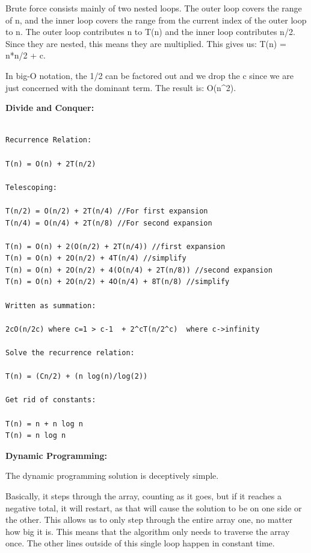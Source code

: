 \documentclass[letterpaper,10pt,titlepage,fleqn]{article}
\begin{document}

Brute force consists mainly of two nested loops. The outer loop covers the range of n, and the inner loop covers the range from the current index of the outer loop to n. The outer loop contributes n to T(n) and the inner loop contributes n/2. Since they are nested, this means they are multiplied. This gives us: T(n) = n*n/2 + c.

In big-O notation, the 1/2 can be factored out and we drop the c since we are just concerned with the dominant term. The result is: O(n^2).

\begin{centering}
\textbf{Divide and Conquer:}
\end{centering}


\begin{lstlisting}

Recurrence Relation:

T(n) = O(n) + 2T(n/2)

Telescoping:

T(n/2) = O(n/2) + 2T(n/4) //For first expansion
T(n/4) = O(n/4) + 2T(n/8) //For second expansion

T(n) = O(n) + 2(O(n/2) + 2T(n/4)) //first expansion
T(n) = O(n) + 2O(n/2) + 4T(n/4) //simplify
T(n) = O(n) + 2O(n/2) + 4(O(n/4) + 2T(n/8)) //second expansion
T(n) = O(n) + 2O(n/2) + 4O(n/4) + 8T(n/8) //simplify

Written as summation:

2cO(n/2c) where c=1 > c-1  + 2^cT(n/2^c)  where c->infinity

Solve the recurrence relation:

T(n) = (Cn/2) + (n log(n)/log(2))

Get rid of constants:

T(n) = n + n log n
T(n) = n log n

\end{lstlisting}

\begin{centering}
\textbf{Dynamic Programming:}
\end{centering}


The dynamic programming solution is deceptively simple.

Basically, it steps through the array, counting as it goes, but if it reaches a negative total, it will restart, as that will cause the solution to be on one side or the other.
This allows us to only step through the entire array one, no matter how big it is. This means that the algorithm only needs to traverse the array once. The other lines outside of this single loop happen in constant time. 
\end{document}
